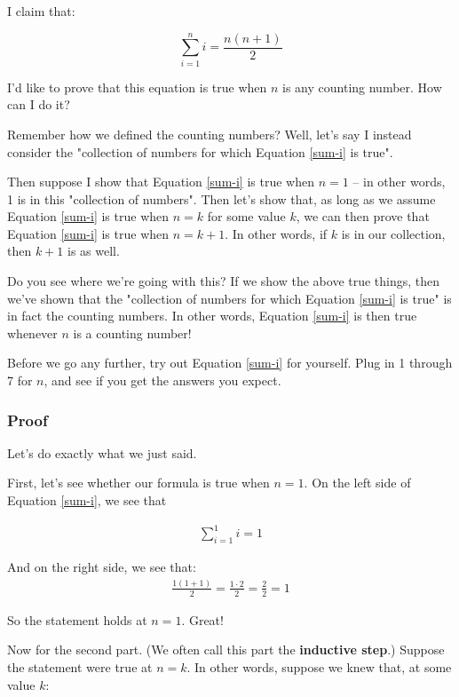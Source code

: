 I claim that:

\begin{equation}
\label{sum-i}
\sum_{i=1}^n i = \frac{n(n+1)}{2}
\end{equation}

I'd like to prove that this equation is true when $n$ is any counting number. How can I do it? 

Remember how we defined the counting numbers? Well, let's say I instead consider the "collection of numbers for which Equation \ref{sum-i} is true". 

Then suppose I show that Equation \ref{sum-i} is true when $n = 1$ -- in other words, 1 is in this "collection of numbers". Then let's show that, as long as we assume Equation \ref{sum-i} is true when $n = k$ for some value $k$, we can then prove that Equation \ref{sum-i} is true when $n = k + 1$. In other words, if $k$ is in our collection, then $k+1$ is as well.

Do you see where we're going with this? If we show the above true things, then we've shown that the "collection of numbers for which Equation \ref{sum-i} is true" is in fact the counting numbers. In other words, Equation \ref{sum-i} is then true whenever $n$ is a counting number!

\begin{exercise}
Before we go any further, try out Equation \ref{sum-i} for yourself. Plug in 1 through 7 for $n$, and see if you get the answers you expect. 
\end{exercise}

\subsubsection{Proof}

Let's do exactly what we just said.

First, let's see whether our formula is true when $n=1$. On the left side of Equation \ref{sum-i}, we see that 

\begin{align*}
\sum_{i=1}^{1} i = 1
\end{align*}

And on the right side, we see that:
\begin{align*}
\frac{1(1+1)}{2} = \frac{1 \cdot 2}{2} = \frac{2}{2} = 1
\end{align*}

So the statement holds at $n = 1$. Great!

Now for the second part. (We often call this part the \textbf{inductive step}.) Suppose the statement were true at $n = k$. In other words, suppose we knew that, at some value $k$:

